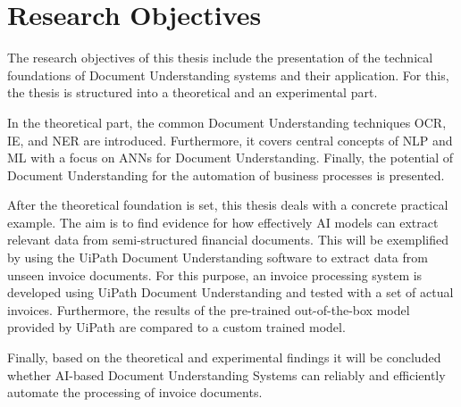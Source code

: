 \section{Research Objectives}




The research objectives of this thesis include the presentation of the technical foundations of Document Understanding systems and their application. For this, the thesis is structured into a theoretical and an experimental part.

In the theoretical part, the common Document Understanding techniques \ac{OCR}, \ac{IE}, and \ac{NER} are introduced. 
Furthermore, it covers central concepts of \ac{NLP} and \ac{ML} with a focus on \acp{ANN} for Document Understanding. 
Finally, the potential of Document Understanding for the automation of business processes is presented.

After the theoretical foundation is set, this thesis deals with a concrete practical example. The aim is to find evidence for how effectively AI models can extract relevant data from semi-structured financial documents. This will be exemplified by using the UiPath Document Understanding software to extract data from unseen invoice documents.
For this purpose, an invoice processing system is developed using UiPath Document Understanding and tested with a set of actual invoices. Furthermore, the results of the pre-trained out-of-the-box model provided by UiPath are compared to a custom trained model.  

Finally, based on the theoretical and experimental findings it will be concluded whether AI-based Document Understanding Systems can reliably and efficiently automate the processing of invoice documents.